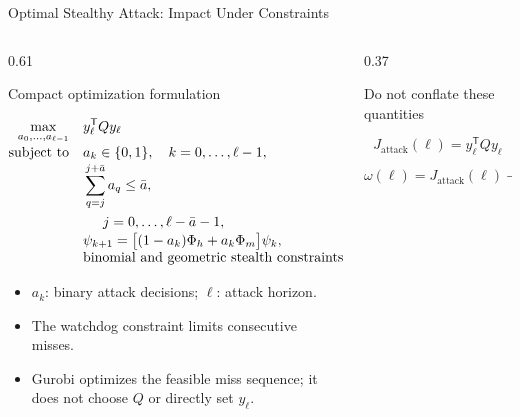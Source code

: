 \documentclass[9pt,aspectratio=169]{beamer}
\newcommand{\tightitemize}{
    \setlength{\itemsep}{1.5pt}
    \setlength{\parskip}{0pt}
    \setlength{\topsep}{2pt}
}
\begin{document}
\begin{frame}{Optimal Stealthy Attack: Impact Under Constraints}

\begin{columns}[T,onlytextwidth]

\begin{column}{0.61\textwidth}

\begin{block}{Compact optimization formulation}

\small

\[
\begin{aligned}
\max_{a_0,\ldots,a_{\ell-1}}\quad
    &y_\ell^{\mathsf T}Qy_\ell\\[-1mm]
\text{subject to}\quad
    &a_k\in\{0,1\},
      \quad k=0,\ldots,\ell-1,\\[-1mm]
    &\sum_{q=j}^{j+\bar a}a_q\leq\bar a,\\
    &\hspace{5mm}j=0,\ldots,\ell-\bar a-1,\\[-1mm]
    &\psi_{k+1}
      =\big[(1-a_k)\Phi_h+a_k\Phi_m\big]\psi_k,\\[-1mm]
    &\text{binomial and geometric stealth constraints.}
\end{aligned}
\]

\end{block}

\begin{itemize}
\tightitemize
    \item $a_k$: binary attack decisions; $\ell$: attack horizon.
    \item The watchdog constraint limits consecutive misses.
    \item Gurobi optimizes the feasible miss sequence; it does
    not choose $Q$ or directly set $y_\ell$.
\end{itemize}

\end{column}


\begin{column}{0.37\textwidth}

\begin{block}{Do not conflate these quantities}

\[
J_{\mathrm{attack}}(\ell)
=y_\ell^{\mathsf T}Qy_\ell
\]

\[
\boxed{
\omega(\ell)
=
J_{\mathrm{attack}}(\ell)
-
J_{\mathrm{nominal}}(\ell)
}
\]


\end{block}
\end{column}
\end{columns}
\end{frame}
\end{document}

